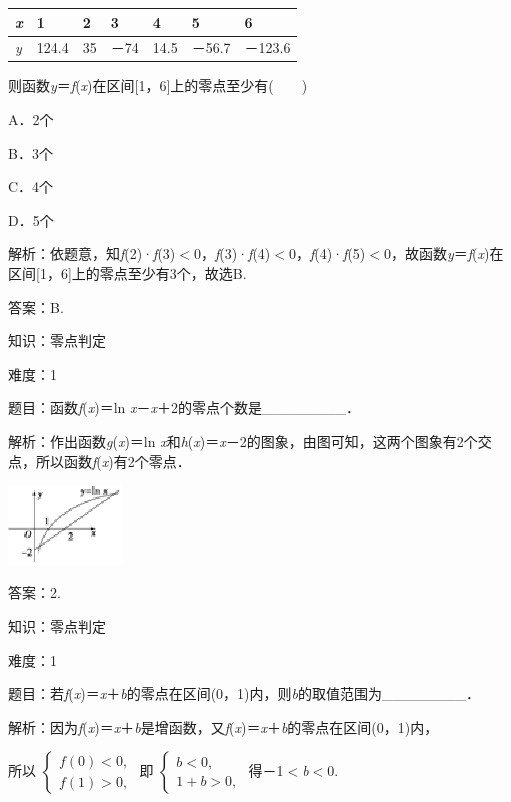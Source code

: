 \documentclass{article} %
\begin{document}
\begin{tabular}{|p{0.2in}|p{0.4in}|p{0.3in}|p{0.4in}|p{0.4in}|p{0.5in}|p{0.6in}|} \hline
	\textit{x} & 1\textit{} & 2\textit{} & 3\textit{} & 4\textit{} & 5\textit{} & 6 \\ \hline
	\textit{y} & 124.4\textit{} & 35\textit{} & －74\textit{} & 14.5\textit{} & －56.7\textit{} & －123.6 \\ \hline
\end{tabular}

则函数\textit{y}＝\textit{f}(\textit{x})在区间[1，6]上的零点至少有(　　)

A．2个  

B．3个 

C．4个  

D．5个

解析：依题意，知\textit{f}(2)·\textit{f}(3)$\mathrm{<}$0，\textit{f}(3)·\textit{f}(4)$\mathrm{<}$0，\textit{f}(4)·\textit{f}(5)$\mathrm{<}$0，故函数\textit{y}＝\textit{f}(\textit{x})在区间[1，6]上的零点至少有3个，故选B.

答案：B.

知识：零点判定

难度：1

题目：函数\textit{f}(\textit{x})＝ln \textit{x}－\textit{x}＋2的零点个数是\_\_\_\_\_\_\_\_．

解析：作出函数\textit{g}(\textit{x})＝ln \textit{x}和\textit{h}(\textit{x})＝\textit{x}－2的图象，由图可知，这两个图象有2个交点，所以函数\textit{f}(\textit{x})有2个零点．

\includegraphics*[width=1.19in, height=0.83in, keepaspectratio=false]{image69}

答案：2.

知识：零点判定

难度：1

题目：若\textit{f}(\textit{x})＝\textit{x}＋\textit{b}的零点在区间(0，1)内，则\textit{b}的取值范围为\_\_\_\_\_\_\_\_．

解析：因为\textit{f}(\textit{x})＝\textit{x}＋\textit{b}是增函数，又\textit{f}(\textit{x})＝\textit{x}＋\textit{b}的零点在区间(0，1)内，

所以
$\left\{
\begin{array}{l}
f(0)<0,\\
f(1)>0,
\end{array}
\right.$
即
$\left\{
\begin{array}{l}
b<0,\\
1+b>0,
\end{array}
\right.$
得－1$\mathrm{<}$\textit{b}$\mathrm{<}$0.
\end{document}
